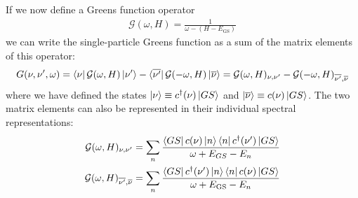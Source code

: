 \documentclass[10pt]{report}
\numberwithin{equation}{section}
\begin{document}
\begin{appendices}
 If we now define a Greens function operator
 \begin{equation}\begin{aligned}
	 \label{inv_G_func}
	 \mathcal{G}(\omega, H) = \frac{1}{\omega - (H - E_\text{GS})}
 \end{aligned}\end{equation}
 we can write the single-particle Greens function as a sum of the matrix elements of this operator:
 \begin{equation}\begin{aligned}
	 \label{G_mat_el}
	 G(\nu, \nu^\prime, \omega) = \bra{\nu} \mathcal{G}(\omega, H) \ket{\nu^\prime} - \bra{\overline{\nu^\prime}} \mathcal{G}(-\omega, H) \ket{\overline\nu} = \mathcal{G}(\omega, H)_{\nu,\nu^\prime} - \mathcal{G}(-\omega, H)_{\overline{\nu^\prime}, \overline\nu}
 \end{aligned}\end{equation}
 where we have defined the states $\ket{\nu} \equiv c^\dagger(\nu)\ket{GS}$ and $\ket{\overline\nu} \equiv c(\nu)\ket{GS}$. The two matrix elements can also be represented in their individual spectral representations:
 \begin{equation}\begin{aligned}
	 \label{G_mat_spec}
 	\mathcal{G}(\omega, H)_{\nu,\nu^\prime} = \sum_{n}\frac{\bra{GS}c(\nu)\ket{n}\bra{n}c^\dagger(\nu^\prime)\ket{GS}}{\omega + E_{GS} - E_n}\\
	\mathcal{G}(\omega, H)_{\overline{\nu^\prime}, \overline\nu} = \sum_{n}\frac{\bra{GS}c^\dagger(\nu^\prime)\ket{n}\bra{n}c(\nu)\ket{GS}}{\omega + E_\text{GS} - E_n}
 \end{aligned}\end{equation}
 

\end{appendices}
\end{document}
